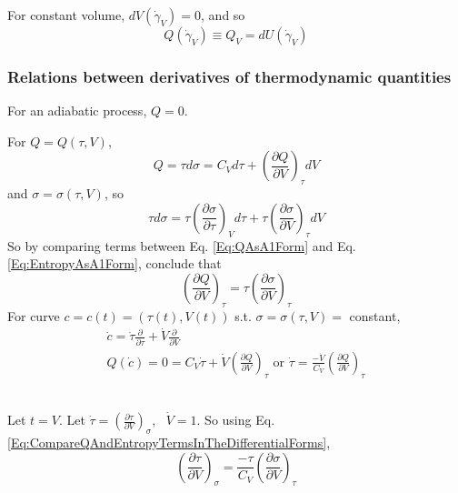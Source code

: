 For constant volume, $dV(\dot{\gamma}_V)=0$, and so 
\[
Q(\dot{\gamma}_V) \equiv Q_V = dU(\dot{\gamma}_V)
\]

\subsubsection{Relations between derivatives of thermodynamic quantities}

For an adiabatic process, $Q=0$. 

For $Q= Q(\tau, V)$, 
\begin{equation}\label{Eq:QAsA1Form}
Q = \tau d\sigma = C_V d\tau + \left( \frac{ \partial Q}{ \partial V} \right)_{\tau} dV
\end{equation}
and $\sigma = \sigma(\tau, V)$, so 
\begin{equation}\label{Eq:EntropyAsA1Form}
\tau d\sigma = \tau \left( \frac{ \partial \sigma}{ \partial \tau } \right)_V d\tau + \tau \left( \frac{ \partial \sigma}{ \partial V} \right)_{\tau} dV
\end{equation}
So by comparing terms between Eq. \ref{Eq:QAsA1Form} and Eq. \ref{Eq:EntropyAsA1Form}, conclude that 
\begin{equation}\label{Eq:CompareQAndEntropyTermsInTheDifferentialForms}
\left( \frac{ \partial Q}{ \partial V} \right)_{\tau} = \tau \left( \frac{ \partial \sigma}{\partial V} \right)_{\tau}
\end{equation} 
For curve $c= c(t) = (\tau(t), V(t))$ s.t. $\sigma = \sigma(\tau, V) = $ constant, 
\[
\begin{gathered}
 \dot{c} = \dot{\tau} \frac{ \partial }{ \partial \tau} + \dot{V} \frac{ \partial }{\partial V}  \\
 Q(\dot{c}) = 0 = C_V\dot{\tau} + \dot{V} \left( \frac{ \partial Q}{\partial V} \right)_{\tau} \text{ or } \dot{\tau} = \frac{- \dot{V}}{C_V} \left( \frac{\partial Q}{ \partial V} \right)_{\tau} 
\end{gathered}
\]

\quad \\ 
Let $t=V$. Let $\dot{\tau} = \left( \frac{\partial \tau}{\partial V} \right)_{\sigma}$, \, $\dot{V} = 1$.  So using Eq. \ref{Eq:CompareQAndEntropyTermsInTheDifferentialForms}, 
\begin{equation}\label{Eq:ConstantVolumeHeatCapacityDifferentialRelationship}
 \left( \frac{ \partial \tau}{ \partial V} \right)_{\sigma} = \frac{-\tau}{C_V} \left( \frac{ \partial \sigma}{ \partial V} \right)_{\tau}
\end{equation}

